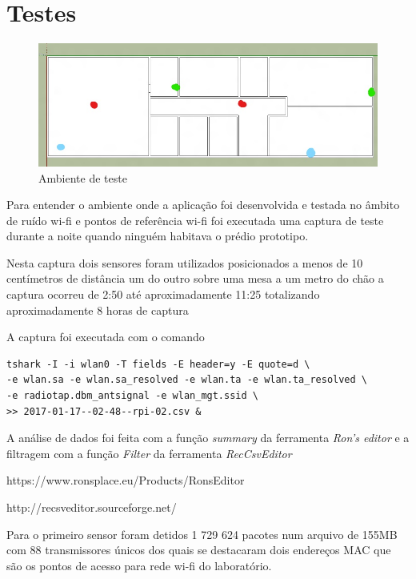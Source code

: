 \chapter{Testes}
\label{chap:Plataformas}


\begin{figure}[htb]
	\caption{\label{fig:modulos-esp}Ambiente de teste}
	\begin{center}
		\includegraphics[width=1\textwidth]{060-testes/data-analisis/planta-baixa_Ink_LI.jpg}
	\end{center}
\end{figure}


Para entender  o ambiente onde a aplicação foi desenvolvida e testada no âmbito
de ruído wi-fi e pontos de referência wi-fi foi executada uma captura de teste
durante a noite quando ninguém habitava o prédio prototipo.

Nesta captura dois sensores foram utilizados posicionados a menos de 10 centímetros
de distância um do outro sobre uma mesa a um metro do chão a captura ocorreu de 2:50
até aproximadamente 11:25 totalizando aproximadamente 8 horas de captura

A captura foi executada com o comando


\begin{verbatim}
tshark -I -i wlan0 -T fields -E header=y -E quote=d \
-e wlan.sa -e wlan.sa_resolved -e wlan.ta -e wlan.ta_resolved \
-e radiotap.dbm_antsignal -e wlan_mgt.ssid \
>> 2017-01-17--02-48--rpi-02.csv &
\end{verbatim}

A análise de dados foi feita com a função \emph{summary} da ferramenta \emph{Ron’s editor}
e a filtragem com a função \emph{Filter} da ferramenta \emph{RecCsvEditor}

https://www.ronsplace.eu/Products/RonsEditor

http://recsveditor.sourceforge.net/

Para o primeiro sensor foram detidos 1 729 624 pacotes num arquivo de 155MB
com 88 transmissores únicos dos quais se destacaram dois endereços MAC que são os
pontos de acesso para rede wi-fi do laboratório.


